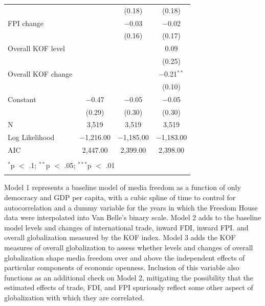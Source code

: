 \documentclass[12pt,a4paper]{article}\usepackage[]{graphicx}\usepackage[]{color}
\begin{document}
{\begin{table}[!htbp]
\begin{tabular}{@{\extracolsep{5pt}}lccc}
  &  & (0.18) & (0.18) \\ 
  FPI change &  & $-$0.03 & $-$0.02 \\ 
  &  & (0.16) & (0.17) \\ 
  Overall KOF level &  &  & 0.09 \\ 
  &  &  & (0.25) \\ 
  Overall KOF change &  &  & $-$0.21$^{**}$ \\ 
  &  &  & (0.10) \\ 
  Constant & $-$0.47 & $-$0.05 & $-$0.05 \\ 
  & (0.29) & (0.30) & (0.30) \\ 
 N & 3,519 & 3,519 & 3,519 \\ 
Log Likelihood & $-$1,216.00 & $-$1,185.00 & $-$1,183.00 \\ 
AIC & 2,447.00 & 2,399.00 & 2,398.00 \\ 
\hline \\[-1.8ex] 
\multicolumn{4}{l}{$^{*}$p $<$ .1; $^{**}$p $<$ .05; $^{***}$p $<$ .01} \\ 
\normalsize 
\end{tabular} 
\end{table} 


\clearpage
}
Model 1 represents a baseline model of media freedom as a function of only democracy and GDP per capita, with a cubic spline of time to control for autocorrelation \parencite{Beck:1998wg} and a dummy variable for the years in which the Freedom House data were interpolated into Van Belle's binary scale. Model 2 adds to the baseline model levels and changes of international trade, inward FDI, inward FPI. and overall globalization measured by the KOF index. Model 3 adds the KOF measures of overall globalization to assess whether levels and changes of overall globalization shape media freedom over and above the independent effects of particular components of economic openness. Inclusion of this variable also functions as an additional check on Model 2, mitigating the possibility that the estimated effects of trade, FDI, and FPI spuriously reflect some other aspect of globalization with which they are correlated.
\end{document}

